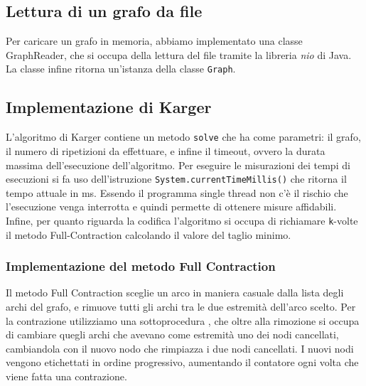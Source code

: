 \subsection{Lettura di un grafo da file}
Per caricare un grafo in memoria, abbiamo implementato una classe GraphReader,
che si occupa della lettura del file tramite la libreria \textit{nio} di Java.
La classe infine ritorna un'istanza della classe \texttt{Graph}.
\subsection{Implementazione di Karger}
L'algoritmo di Karger contiene un metodo \texttt{solve} che ha come parametri: il grafo,
il numero di ripetizioni da effettuare, e infine il timeout, ovvero la durata massima
dell'esecuzione dell'algoritmo.
Per eseguire le misurazioni dei tempi di esecuzioni si fa uso dell'istruzione
\texttt{System.currentTimeMillis()} che ritorna il tempo attuale in ms.
Essendo il programma single thread non c'è il rischio che l'esecuzione venga interrotta e
quindi permette di ottenere misure affidabili.
Infine, per quanto riguarda la codifica l'algoritmo si occupa di richiamare \texttt{k}-volte
il metodo Full-Contraction calcolando il valore del taglio minimo.
\subsubsection{Implementazione del metodo Full Contraction}
Il metodo Full Contraction sceglie un arco in maniera casuale dalla lista degli archi del grafo, e rimuove
tutti gli archi tra le due estremità dell'arco scelto. Per la contrazione utilizziamo una sottoprocedura ,
che oltre alla rimozione si occupa di cambiare quegli archi che avevano come estremità uno dei nodi cancellati, cambiandola
con il nuovo nodo che rimpiazza i due nodi cancellati. I nuovi nodi vengono etichettati in ordine progressivo,
aumentando il contatore ogni volta che viene fatta una contrazione.
